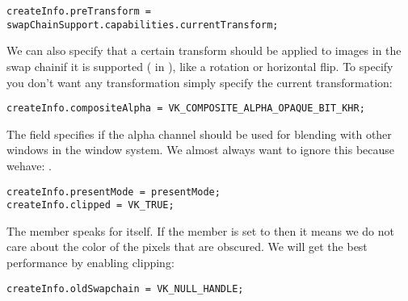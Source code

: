 \begin{center}
\begin{minipage}{0.95\linewidth}
\begin{lstlisting}
createInfo.preTransform = swapChainSupport.capabilities.currentTransform;
\end{lstlisting}
\end{minipage}
\end{center}

\par We can also specify that a certain transform should be applied to images in the swap chainif it is supported ( in ), like a rotation or horizontal flip. To specify you don't want any transformation simply specify the current transformation:

\begin{center}
\begin{minipage}{0.95\linewidth}
\begin{lstlisting}
createInfo.compositeAlpha = VK_COMPOSITE_ALPHA_OPAQUE_BIT_KHR;
\end{lstlisting}
\end{minipage}
\end{center}

\par The  field specifies if the alpha channel should be used for blending with other windows in the window system. We almost always want to ignore this because wehave: .

\begin{center}
\begin{minipage}{0.95\linewidth}
\begin{lstlisting}
createInfo.presentMode = presentMode;
createInfo.clipped = VK_TRUE;
\end{lstlisting}
\end{minipage}
\end{center}

\par The  member speaks for itself. If the  member is set to  then it means we do not care about the color of the pixels that are obscured. We will get the best performance by enabling clipping:

\begin{center}
\begin{minipage}{0.95\linewidth}
\begin{lstlisting}
createInfo.oldSwapchain = VK_NULL_HANDLE;
\end{lstlisting}
\end{minipage}
\end{center}

